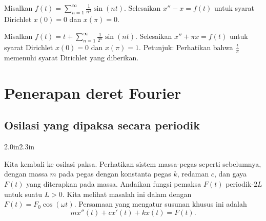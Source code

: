 \begin{exercise}
Misalkan $f(t) = \sum_{n=1}^\infty \frac{1}{n^2} \sin(nt)$.  Selesaikan
$x''- x = f(t)$ untuk syarat Dirichlet $x(0) = 0$
dan $x(\pi) = 0$.
\end{exercise}

\begin{exercise}[menantang]
Misalkan $f(t) = t + \sum_{n=1}^\infty \frac{1}{2^n} \sin(nt)$.  Selesaikan
$x'' + \pi x = f(t)$ untuk syarat Dirichlet $x(0) = 0$
dan $x(\pi) = 1$.  Petunjuk:  Perhatikan bahwa $\frac{t}{\pi}$ memenuhi
syarat Dirichlet yang diberikan.
\end{exercise}



\sectionnewpage
\section{Penerapan deret Fourier}
\label{appoffourier:section}



\subsection{Osilasi yang dipaksa secara periodik}

\begin{mywrapfigsimp}{2.0in}{2.3in}
\noindent
{}
\end{mywrapfigsimp}
Kita kembali ke osilasi paksa.  Perhatikan sistem massa-pegas seperti
sebelumnya, dengan massa $m$
pada pegas dengan konstanta pegas $k$,
redaman $c$, dan gaya $F(t)$ yang diterapkan pada massa.  Andaikan 
fungsi pemaksa $F(t)$ periodik-$2L$ untuk suatu $L > 0$.
Kita melihat
masalah ini dalam  dengan $F(t) = F_0 \cos (\omega t)$.  Persamaan
yang mengatur susunan khusus ini adalah
\begin{equation} \label{afs:eq}
mx''(t) + cx'(t) + kx(t) = F(t) .
\end{equation}

